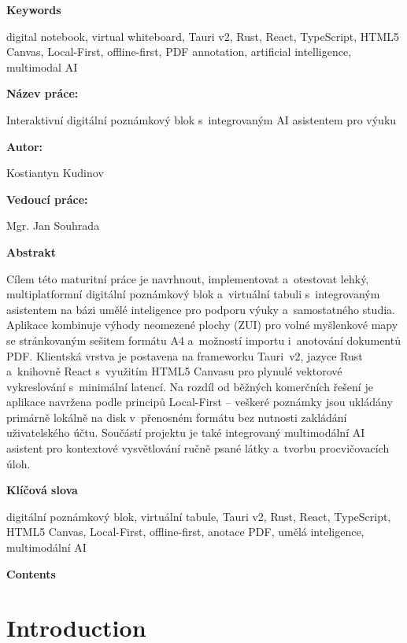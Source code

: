 \documentclass[12pt, a4paper, oneside]{article}
\newcommand{\NazevPraceCs}{Interaktivní digitální poznámkový blok s~integrovaným AI asistentem pro výuku}
\newcommand{\Autor}{Kostiantyn Kudinov}
\newcommand{\Vedouci}{Mgr. Jan Souhrada}
\newcommand{\nadpismimoobsah}[1]{%
    \vspace{6pt}%
    {\normalfont\fontsize{14pt}{18pt}\selectfont\sffamily\bfseries #1\par}%
    \vspace{2pt}%
}
\begin{document}
\nadpismimoobsah{Keywords}
digital notebook, virtual whiteboard, Tauri v2, Rust, React, TypeScript, HTML5 Canvas, Local-First, offline-first, PDF annotation, artificial intelligence, multimodal AI

\clearpage

\nadpismimoobsah{Název práce:}
\NazevPraceCs

\nadpismimoobsah{Autor:}
\Autor

\nadpismimoobsah{Vedoucí práce:}
\Vedouci

\nadpismimoobsah{Abstrakt}
Cílem této maturitní práce je navrhnout, implementovat a~otestovat lehký, multiplatformní digitální poznámkový blok a~virtuální tabuli s~integrovaným asistentem na bázi umělé inteligence pro podporu výuky a~samostatného studia. Aplikace kombinuje výhody neomezené plochy (ZUI) pro volné myšlenkové mapy se stránkovaným sešitem formátu A4 a~možností importu i~anotování dokumentů PDF. Klientská vrstva je postavena na frameworku Tauri~v2, jazyce Rust a~knihovně React s~využitím HTML5 Canvasu pro plynulé vektorové vykreslování s~minimální latencí. Na rozdíl od běžných komerčních řešení je aplikace navržena podle principů Local-First – veškeré poznámky jsou ukládány primárně lokálně na disk v~přenosném formátu bez nutnosti zakládání uživatelského účtu. Součástí projektu je také integrovaný multimodální AI asistent pro kontextové vysvětlování ručně psané látky a~tvorbu procvičovacích úloh.

\nadpismimoobsah{Klíčová slova}
digitální poznámkový blok, virtuální tabule, Tauri v2, Rust, React, TypeScript, HTML5 Canvas, Local-First, offline-first, anotace PDF, umělá inteligence, multimodální AI

\clearpage

\nadpismimoobsah{Contents}
\makeatletter
{}
\makeatother

\clearpage

\section{Introduction}
\label{sec:uvod}
\end{document}
